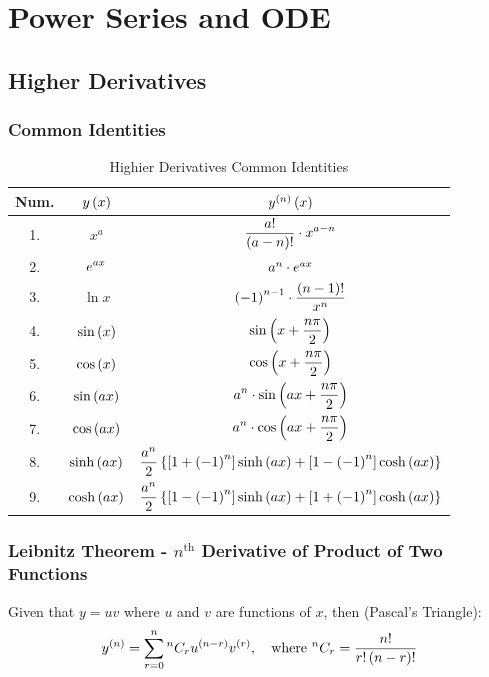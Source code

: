 
\section{Power Series and ODE}
\subsection{Higher Derivatives}
\subsubsection{Common Identities}
\begin{table}[H]
    \centering
    \renewcommand{\arraystretch}{2.2}
    \caption{Highier Derivatives Common Identities}
    \label{table:4.1}
    \begin{tabular}{|c|c|c|}\hline
       Num.&$y\left(x\right)$&$y^{\left(n\right)}\left(x\right)$\\ \hline
       1.&$x^a$&$\displaystyle\frac{a!}{\left(a-n\right)!}\cdot x^{a-n}$\\
       2.&$\displaystyle e^{ax}$&$a^n\cdot e^{ax}$\\
       3.&$\displaystyle\ln{x}$&$\displaystyle\left(-1\right)^{n-1}\cdot\frac{\left(n-1\right)!}{x^n}$\\
       4.&$\displaystyle\sin\left(x\right)$&$\displaystyle \sin\left(x+\frac{n\pi}{2}\right)$\\
       5.&$\displaystyle\cos\left(x\right)$&$\displaystyle \cos\left(x+\frac{n\pi}{2}\right)$\\
       6.&$\displaystyle\sin\left(ax\right)$&$\displaystyle a^n\cdot\sin\left(ax+\frac{n\pi}{2}\right)$\\
       7.&$\displaystyle\cos\left(ax\right)$&$\displaystyle a^n\cdot\cos\left(ax+\frac{n\pi}{2}\right)$\\
       8.&$\displaystyle\sinh\left(ax\right)$&$\displaystyle\frac{a^n}{2}\left\{\left[1+\left(-1\right)^n\right]\sinh\left(ax\right)+\left[1-\left(-1\right)^n\right]\cosh\left(ax\right)\right\}$\\
       9.&$\displaystyle\cosh\left(ax\right)$&$\displaystyle\frac{a^n}{2}\left\{\left[1-\left(-1\right)^n\right]\sinh\left(ax\right)+\left[1+\left(-1\right)^n\right]\cosh\left(ax\right)\right\}$\\\hline
    \end{tabular}
\end{table}
\subsubsection{Leibnitz Theorem - $n^\text{th}$ Derivative of Product of Two Functions}
Given that $y=uv$ where $u$ and $v$ are functions of $x$, then (Pascal's Triangle):
\begin{equation}\label{eqn:4.1}
    y^{\left(n\right)}=\sum_{r=0}^{n}{}^nC_ru^{\left(n-r\right)}v^{\left(r\right)},\quad\text{where }{}^nC_r=\frac{n!}{r!\left(n-r\right)!}
\end{equation}
